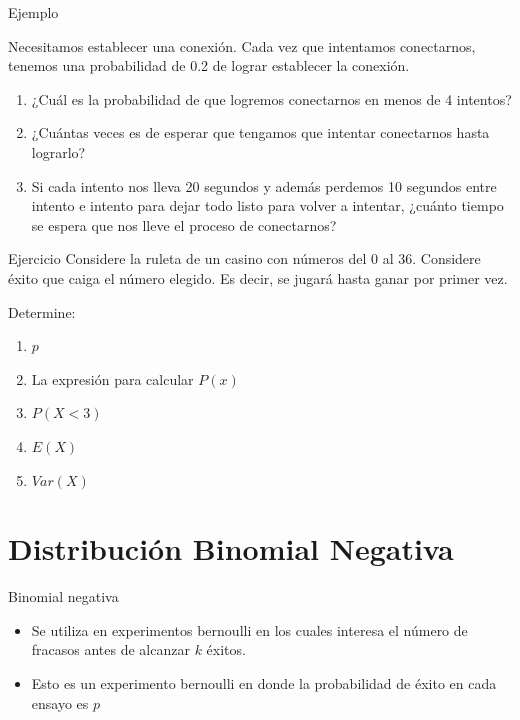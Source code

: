 \documentclass[11pt]{beamer}
\begin{document}
\begin{frame}{Ejemplo}

Necesitamos establecer una conexión. Cada vez que intentamos conectarnos, tenemos una probabilidad de 0.2 de lograr establecer la conexión.
\begin{enumerate}
\item ¿Cuál es la probabilidad de que logremos conectarnos en menos de 4 intentos?

\item  ¿Cuántas veces es de esperar que tengamos que intentar conectarnos hasta lograrlo?

\item Si cada intento nos lleva 20 segundos y además perdemos 10 segundos entre intento e intento para dejar todo listo para volver a intentar, ¿cuánto tiempo se espera que nos lleve el proceso de conectarnos?
\end{enumerate}
\end{frame}


\begin{frame}{Ejercicio}
Considere la ruleta de un casino con n\'umeros del 0 al 36. Considere éxito que caiga el número elegido.  Es decir, se jugará hasta ganar por primer vez. 

\bigskip
Determine:

\begin{enumerate}
  \item $p$
  \item La expresión para calcular $P(x)$
  \item $P(X  < 3)$
  \item $E(X)$
  \item $Var(X)$
\end{enumerate}
\end{frame}


\section{Distribución Binomial Negativa}



\begin{frame}{Binomial negativa}
\begin{itemize}
\item Se utiliza en experimentos bernoulli en los cuales interesa el número de fracasos antes de alcanzar $k$ éxitos.

\item  Esto es un experimento bernoulli en donde la probabilidad de éxito en cada ensayo es $p$

\end{itemize}
\end{frame}
\end{document}
